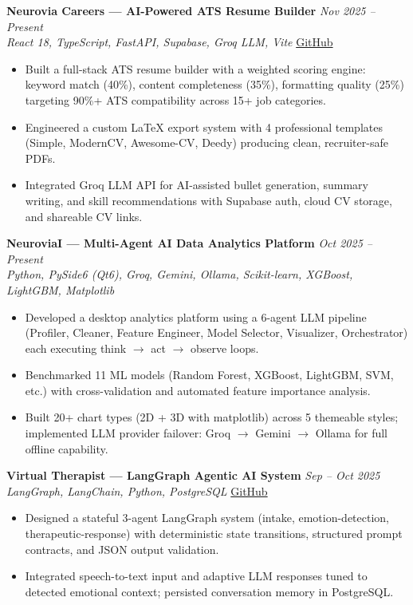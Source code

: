 \documentclass[11pt]{article}
\begin{document}
\vspace{4pt}
\textbf{Neurovia Careers --- AI-Powered ATS Resume Builder} \hfill \textit{Nov 2025 -- Present} \\
\textit{React 18, TypeScript, FastAPI, Supabase, Groq LLM, Vite} \hfill \href{https://github.com/JeetInTech/CvForge-Online}{GitHub}
\begin{itemize}
  \item Built a full-stack ATS resume builder with a weighted scoring engine: keyword match (40\%), content completeness (35\%), formatting quality (25\%) targeting 90\%+ ATS compatibility across 15+ job categories.
  \item Engineered a custom LaTeX export system with 4 professional templates (Simple, ModernCV, Awesome-CV, Deedy) producing clean, recruiter-safe PDFs.
  \item Integrated Groq LLM API for AI-assisted bullet generation, summary writing, and skill recommendations with Supabase auth, cloud CV storage, and shareable CV links.
\end{itemize}

\vspace{4pt}
\textbf{NeuroviaI --- Multi-Agent AI Data Analytics Platform} \hfill \textit{Oct 2025 -- Present} \\
\textit{Python, PySide6 (Qt6), Groq, Gemini, Ollama, Scikit-learn, XGBoost, LightGBM, Matplotlib}
\begin{itemize}
  \item Developed a desktop analytics platform using a 6-agent LLM pipeline (Profiler, Cleaner, Feature Engineer, Model Selector, Visualizer, Orchestrator) each executing think $\rightarrow$ act $\rightarrow$ observe loops.
  \item Benchmarked 11 ML models (Random Forest, XGBoost, LightGBM, SVM, etc.) with cross-validation and automated feature importance analysis.
  \item Built 20+ chart types (2D + 3D with matplotlib) across 5 themeable styles; implemented LLM provider failover: Groq $\rightarrow$ Gemini $\rightarrow$ Ollama for full offline capability.
\end{itemize}

\vspace{4pt}
\textbf{Virtual Therapist --- LangGraph Agentic AI System} \hfill \textit{Sep -- Oct 2025} \\
\textit{LangGraph, LangChain, Python, PostgreSQL} \hfill \href{https://github.com/JeetInTech/Virtual-Therapist---LangGraph-Agentic-AI-System}{GitHub}
\begin{itemize}
  \item Designed a stateful 3-agent LangGraph system (intake, emotion-detection, therapeutic-response) with deterministic state transitions, structured prompt contracts, and JSON output validation.
  \item Integrated speech-to-text input and adaptive LLM responses tuned to detected emotional context; persisted conversation memory in PostgreSQL.
\end{itemize}
\end{document}

